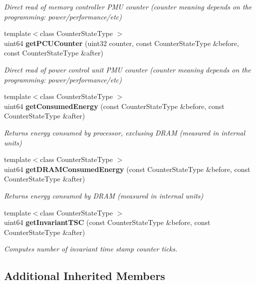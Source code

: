 \begin{DoxyCompactItemize}
\begin{DoxyCompactList}\small\item\em Direct read of memory controller P\+MU counter (counter meaning depends on the programming\+: power/performance/etc) \end{DoxyCompactList}\item 
{\footnotesize template$<$class Counter\+State\+Type $>$ }\\uint64 {\bf get\+P\+C\+U\+Counter} (uint32 counter, const Counter\+State\+Type \&before, const Counter\+State\+Type \&after)
\begin{DoxyCompactList}\small\item\em Direct read of power control unit P\+MU counter (counter meaning depends on the programming\+: power/performance/etc) \end{DoxyCompactList}\item 
{\footnotesize template$<$class Counter\+State\+Type $>$ }\\uint64 {\bf get\+Consumed\+Energy} (const Counter\+State\+Type \&before, const Counter\+State\+Type \&after)
\begin{DoxyCompactList}\small\item\em Returns energy consumed by processor, exclusing D\+R\+AM (measured in internal units) \end{DoxyCompactList}\item 
{\footnotesize template$<$class Counter\+State\+Type $>$ }\\uint64 {\bf get\+D\+R\+A\+M\+Consumed\+Energy} (const Counter\+State\+Type \&before, const Counter\+State\+Type \&after)
\begin{DoxyCompactList}\small\item\em Returns energy consumed by D\+R\+AM (measured in internal units) \end{DoxyCompactList}\item 
{\footnotesize template$<$class Counter\+State\+Type $>$ }\\uint64 {\bf get\+Invariant\+T\+SC} (const Counter\+State\+Type \&before, const Counter\+State\+Type \&after)
\begin{DoxyCompactList}\small\item\em Computes number of invariant time stamp counter ticks. \end{DoxyCompactList}\end{DoxyCompactItemize}
\subsection*{Additional Inherited Members}


